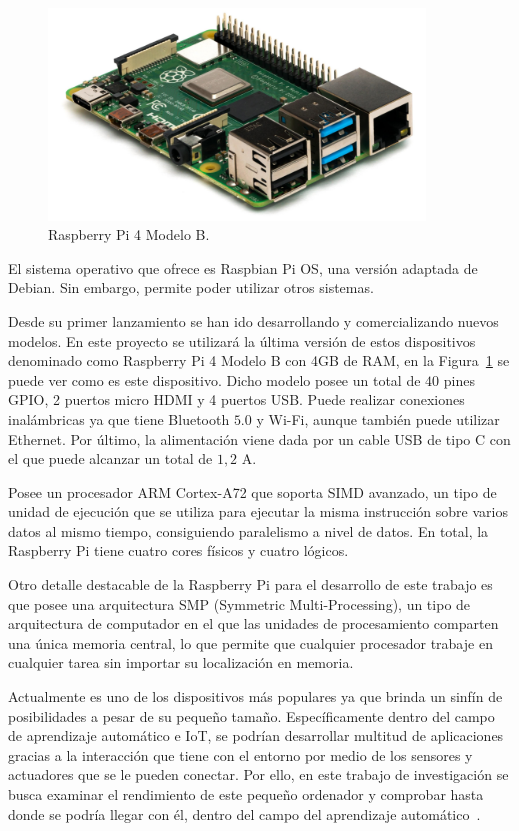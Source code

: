 \documentclass[a4paper, 12pt]{book}
\begin{document}
\begin{figure}[htb]
  \centering
  \includegraphics[width=10cm, keepaspectratio]{img/real_raspberry.png}
  \caption{Raspberry Pi 4 Modelo B.}\label{fig:raspberry_pi}
\end{figure}

El sistema operativo que ofrece es Raspbian Pi OS, una versión adaptada de Debian. Sin embargo, permite poder utilizar otros sistemas.

Desde su primer lanzamiento se han ido desarrollando y comercializando nuevos modelos. En este proyecto se utilizará la última versión de estos dispositivos denominado como Raspberry Pi 4 Modelo B con 4GB de RAM, en la Figura~\ref{fig:raspberry_pi} se puede ver como es este dispositivo. Dicho modelo posee un total de $40$ pines GPIO, 2 puertos micro HDMI y 4 puertos USB. Puede realizar conexiones inalámbricas ya que tiene Bluetooth $5.0$ y Wi-Fi, aunque también puede utilizar Ethernet. Por último, la alimentación viene dada por un cable USB de tipo C con el que puede alcanzar un total de $1,2$ A.

Posee un procesador ARM Cortex-A72 que soporta SIMD avanzado, un tipo de unidad de ejecución que se utiliza para ejecutar la misma instrucción sobre varios datos al mismo tiempo, consiguiendo paralelismo a nivel de datos. En total, la Raspberry Pi tiene cuatro cores físicos y cuatro lógicos. 

Otro detalle destacable de la Raspberry Pi para el desarrollo de este trabajo es que posee una arquitectura SMP (Symmetric Multi-Processing), un tipo de arquitectura de computador en el que las unidades de procesamiento comparten una única memoria central, lo que permite que cualquier procesador trabaje en cualquier tarea sin importar su localización en memoria. 

Actualmente es uno de los dispositivos más populares ya que brinda un sinfín de posibilidades a pesar de su pequeño tamaño. Específicamente dentro del campo de aprendizaje automático e IoT, se podrían desarrollar multitud de aplicaciones gracias a la interacción que tiene con el entorno por medio de los sensores y actuadores que se le pueden conectar. Por ello, en este trabajo de investigación se busca examinar el rendimiento de este pequeño ordenador y comprobar hasta donde se podría llegar con él, dentro del campo del aprendizaje automático~\cite{Garcia-Martin2019}. 
\end{document}
